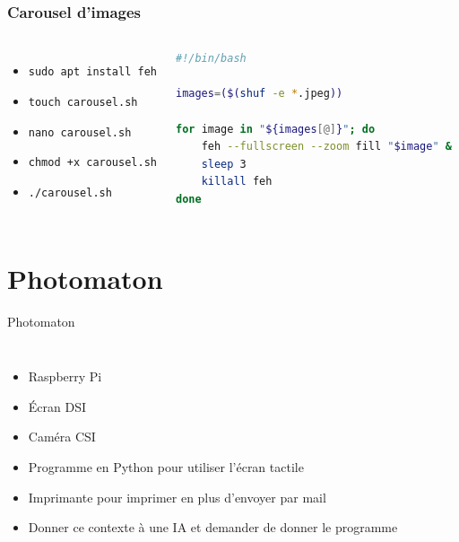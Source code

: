 \documentclass[aspectratio=169,xcolor=dvipsnames]{beamer}
\begin{document}
\begin{frame}[fragile]
\frametitle{Carousel d'images}
    \begin{columns}[c] %

        \begin{itemize}
            \item \texttt{sudo apt install feh}
            \item \texttt{touch carousel.sh}
            \item \texttt{nano carousel.sh}
            \item \texttt{chmod +x carousel.sh}
            \item \texttt{./carousel.sh}
        \end{itemize}

        \begin{lstlisting}[language=Bash, caption=carousel.sh]
#!/bin/bash

images=($(shuf -e *.jpeg))

for image in "${images[@]}"; do
    feh --fullscreen --zoom fill "$image" &
    sleep 3
    killall feh
done
        \end{lstlisting}

    \end{columns}
\end{frame}

\section{Photomaton}

\begin{frame}{Photomaton}
    \begin{columns}[c] %

        \begin{itemize}
            \item Raspberry Pi
            \item Écran DSI
            \item Caméra CSI
            \item Programme en Python pour utiliser l'écran tactile
            \item Imprimante pour imprimer en plus d'envoyer par mail
            \item Donner ce contexte à une IA et demander de donner le programme
        \end{itemize}

    \end{columns}
\end{frame}
\end{document}
